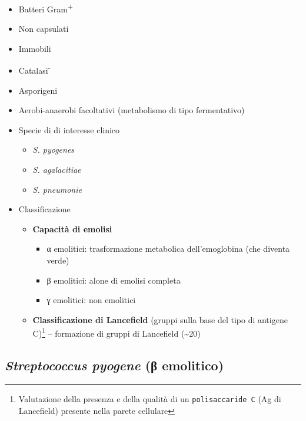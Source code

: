 \documentclass[italian,]{article}
\providecommand{\tightlist}{%
  \setlength{\itemsep}{0pt}\setlength{\parskip}{0pt}}
\begin{document}
\begin{itemize}
\tightlist
\item
  Batteri Gram\textsuperscript{+}
\item
  Non capsulati
\item
  Immobili
\item
  Catalasi\textsuperscript{-}
\item
  Asporigeni
\item
  Aerobi-anaerobi facoltativi (metabolismo di tipo fermentativo)
\item
  Specie di di interesse clinico

  \begin{itemize}
  \tightlist
  \item
    \emph{S. pyogenes}
  \item
    \emph{S. agalacitiae}
  \item
    \emph{S. pneumonie}
  \end{itemize}
\item
  Classificazione

  \begin{itemize}
  \tightlist
  \item
    \textbf{Capacità di emolisi}

    \begin{itemize}
    \tightlist
    \item
      α emolitici: trasformazione metabolica dell'emoglobina (che
      diventa verde)
    \item
      β emolitici: alone di emolisi completa
    \item
      γ emolitici: non emolitici
    \end{itemize}
  \item
    \textbf{Classificazione di Lancefield} (gruppi sulla base del tipo
    di antigene C)\footnote{Valutazione della presenza e della qualità
      di un \texttt{polisaccaride\ C} (Ag di Lancefield) presente nella
      parete cellulare} -- formazione di gruppi di Lancefield
    (\textasciitilde{}20)
  \end{itemize}
\end{itemize}

\hypertarget{streptococcus-pyogene-ux3b2-emolitico}{%
\subsection{\texorpdfstring{\emph{Streptococcus pyogene} (β
emolitico)}{Streptococcus pyogene (β emolitico)}}\label{streptococcus-pyogene-ux3b2-emolitico}}
\end{document}
